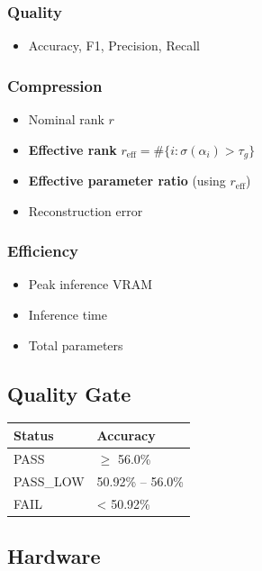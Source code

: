 \subsubsection{Quality}
\begin{itemize}
\item Accuracy, F1, Precision, Recall

\end{itemize}
\subsubsection{Compression}
\begin{itemize}
\item Nominal rank $r$
\item \textbf{Effective rank} $r_\text{eff} = \#\{i : \sigma(\alpha_i) > \tau_g\}$
\item \textbf{Effective parameter ratio} (using $r_\text{eff}$)
\item Reconstruction error

\end{itemize}
\subsubsection{Efficiency}
\begin{itemize}
\item Peak inference VRAM
\item Inference time
\item Total parameters

\end{itemize}
\subsection{Quality Gate}

\begin{table}[H]
\centering
\small
\begin{tabular}{ll}
\toprule
\textbf{Status} & \textbf{Accuracy} \\
\midrule
PASS & $\ge$ 56.0\% \\
PASS\_LOW & 50.92\% -- 56.0\% \\
FAIL & \textless{} 50.92\% \\
\bottomrule
\end{tabular}
\end{table}

\subsection{Hardware}

